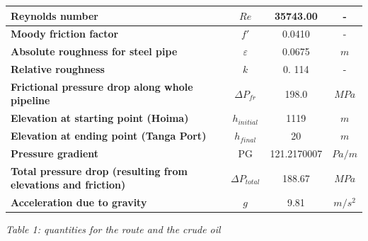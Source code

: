 \documentclass[12pt]{article}
\begin{document}
\begin{table}[H]
\begin{tabular}{|l|c|c|c|}
    \hline
    \textbf{Reynolds number} & $Re$ & 35743.00 & - \\
    \hline
    \textbf{Moody friction factor} & $f'$ & 0.0410 & - \\
    \hline
    \textbf{Absolute roughness for steel pipe} & $\varepsilon$ & 0.0675 & $m$ \\
    \hline
    \textbf{Relative roughness} & $k$ & 0. 114 & - \\
    \hline
    \textbf{Frictional pressure drop along whole pipeline} & $\Delta{P_{fr}}$ & 198.0 & $MPa$ \\
    \hline
    \textbf{Elevation at starting point (Hoima)} & $h_{initial}$ & 1119 & $m$ \\
    \hline
    \textbf{Elevation at ending point (Tanga Port)} & $h_{final}$ & 20 & $m$ \\
    \hline
    \textbf{Pressure gradient} & PG & 121.2170007 & $Pa/m$ \\
    \hline
    \textbf{Total pressure drop (resulting from elevations and friction)} & $\Delta{P_{total}}$ & 188.67 & $MPa$ \\
    \hline
    \textbf{Acceleration due to gravity} & $g$ & 9.81 & $m/s^2$ \\
    \hline

  \end{tabular}
  \raggedright
  \vspace{2mm}

  \textit{Table 1: quantities for the route and the crude oil}
  \label{tab:table_with_line_breaks}
\end{table}
\end{document}
